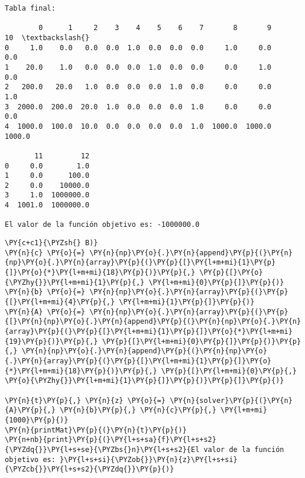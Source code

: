     \begin{Verbatim}[commandchars=\\\{\}]
Tabla final:

        0      1     2    3    4    5    6    7       8       9       10  \textbackslash{}
0     1.0    0.0   0.0  0.0  1.0  0.0  0.0  0.0     1.0     0.0     0.0   
1    20.0    1.0   0.0  0.0  0.0  1.0  0.0  0.0     0.0     1.0     0.0   
2   200.0   20.0   1.0  0.0  0.0  0.0  1.0  0.0     0.0     0.0     1.0   
3  2000.0  200.0  20.0  1.0  0.0  0.0  0.0  1.0     0.0     0.0     0.0   
4  1000.0  100.0  10.0  0.0  0.0  0.0  0.0  1.0  1000.0  1000.0  1000.0   

       11         12  
0     0.0        1.0  
1     0.0      100.0  
2     0.0    10000.0  
3     1.0  1000000.0  
4  1001.0  1000000.0  

El valor de la función objetivo es: -1000000.0
\end{Verbatim}

    \begin{tcolorbox}[breakable, size=fbox, boxrule=1pt, pad at break*=1mm,colback=cellbackground, colframe=cellborder]
\begin{Verbatim}[commandchars=\\\{\}]
\PY{c+c1}{\PYZsh{} B)}
\PY{n}{c} \PY{o}{=} \PY{n}{np}\PY{o}{.}\PY{n}{append}\PY{p}{(}\PY{n}{np}\PY{o}{.}\PY{n}{array}\PY{p}{(}\PY{p}{[}\PY{l+m+mi}{1}\PY{p}{]}\PY{o}{*}\PY{l+m+mi}{18}\PY{p}{)}\PY{p}{,} \PY{p}{[}\PY{o}{\PYZhy{}}\PY{l+m+mi}{1}\PY{p}{,} \PY{l+m+mi}{0}\PY{p}{]}\PY{p}{)}
\PY{n}{b} \PY{o}{=} \PY{n}{np}\PY{o}{.}\PY{n}{array}\PY{p}{(}\PY{p}{[}\PY{l+m+mi}{4}\PY{p}{,} \PY{l+m+mi}{1}\PY{p}{]}\PY{p}{)}
\PY{n}{A} \PY{o}{=} \PY{n}{np}\PY{o}{.}\PY{n}{array}\PY{p}{(}\PY{p}{[}\PY{n}{np}\PY{o}{.}\PY{n}{append}\PY{p}{(}\PY{n}{np}\PY{o}{.}\PY{n}{array}\PY{p}{(}\PY{p}{[}\PY{l+m+mi}{1}\PY{p}{]}\PY{o}{*}\PY{l+m+mi}{19}\PY{p}{)}\PY{p}{,} \PY{p}{[}\PY{l+m+mi}{0}\PY{p}{]}\PY{p}{)}\PY{p}{,} \PY{n}{np}\PY{o}{.}\PY{n}{append}\PY{p}{(}\PY{n}{np}\PY{o}{.}\PY{n}{array}\PY{p}{(}\PY{p}{[}\PY{l+m+mi}{1}\PY{p}{]}\PY{o}{*}\PY{l+m+mi}{18}\PY{p}{)}\PY{p}{,} \PY{p}{[}\PY{l+m+mi}{0}\PY{p}{,} \PY{o}{\PYZhy{}}\PY{l+m+mi}{1}\PY{p}{]}\PY{p}{)}\PY{p}{]}\PY{p}{)}

\PY{n}{t}\PY{p}{,} \PY{n}{z} \PY{o}{=} \PY{n}{solver}\PY{p}{(}\PY{n}{A}\PY{p}{,} \PY{n}{b}\PY{p}{,} \PY{n}{c}\PY{p}{,} \PY{l+m+mi}{1000}\PY{p}{)}
\PY{n}{printMat}\PY{p}{(}\PY{n}{t}\PY{p}{)}
\PY{n+nb}{print}\PY{p}{(}\PY{l+s+sa}{f}\PY{l+s+s2}{\PYZdq{}}\PY{l+s+se}{\PYZbs{}n}\PY{l+s+s2}{El valor de la función objetivo es: }\PY{l+s+si}{\PYZob{}}\PY{n}{z}\PY{l+s+si}{\PYZcb{}}\PY{l+s+s2}{\PYZdq{}}\PY{p}{)}
\end{Verbatim}
\end{tcolorbox}

